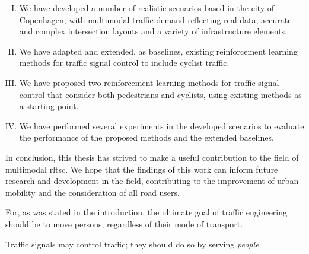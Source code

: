 \begin{enumerate}[I.]
   \item We have developed a number of realistic scenarios based in the city of Copenhagen, with multimodal traffic demand reflecting real data, accurate and complex intersection layouts and a variety of infrastructure elements. 
   \item We have adapted and extended, as baselines, existing reinforcement learning methods for traffic signal control to include cyclist traffic.
   \item We have proposed two reinforcement learning methods for traffic signal control that consider both pedestrians and cyclists, using existing methods as a starting point.
   \item We have performed several experiments in the developed scenarios to evaluate the performance of the proposed methods and the extended baselines.
\end{enumerate}

\noindent In conclusion, this thesis has strived to make a useful contribution to the field of multimodal \gls{rltsc}. We hope that the findings of this work can inform future research and development in the field, contributing to the improvement of urban mobility and the consideration of all road users.

\medskip 

\noindent For, as was stated in the introduction, the ultimate goal of traffic engineering should be to move persons, regardless of their mode of transport.
\medskip 

\noindent Traffic signals may control traffic; they should do so by serving \textit{people}.

\clearpage